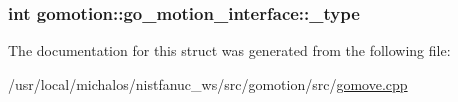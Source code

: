 \hypertarget{structgomotion_1_1go__motion__interface_a10ef45dfc2f8c62e518fb23bacef0fda}{
\subsubsection[{\-\_\-type}]{\setlength{\rightskip}{0pt plus 5cm}int gomotion\-::go\-\_\-motion\-\_\-interface\-::\-\_\-type}}\label{structgomotion_1_1go__motion__interface_a10ef45dfc2f8c62e518fb23bacef0fda}


The documentation for this struct was generated from the following file\-:\begin{DoxyCompactItemize}
\item 
/usr/local/michalos/nistfanuc\-\_\-ws/src/gomotion/src/\hyperlink{gomove_8cpp}{gomove.\-cpp}\end{DoxyCompactItemize}
